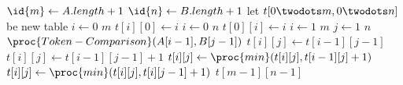 \begin{codebox}
\li $\id{m} \gets A.length + 1$
\li $\id{n} \gets B.length + 1$
\li let $t[0 \twodots m, 0 \twodots n]$ be new table
\li \For $i \gets 0$ \To $m$ \Do
\li $t[i][0] \gets i$ \End
\li \For $i \gets 0$ \To $n$ \Do
\li $t[0][i] \gets i$ \End
\li \For $i \gets 1$ \To $m$ \Do
\li \For $j \gets 1$ \To $n$ \Do
\li \If $\proc{Token-Comparison}(A[i-1], B[j-1])$ \Then
\li $t[i][j] \gets t[i - 1][j - 1]$
\li \Else
\li $t[i][j] \gets t[i - 1][j - 1] + 1$ \End
\li $t[i][j] \gets \proc{min}(t[i][j],t[i-1][j]+1)$
\li $t[i][j] \gets \proc{min}(t[i][j],t[i][j-1]+1)$ \End \End
\li \Return $t[m - 1][n - 1]$
\end{codebox}
